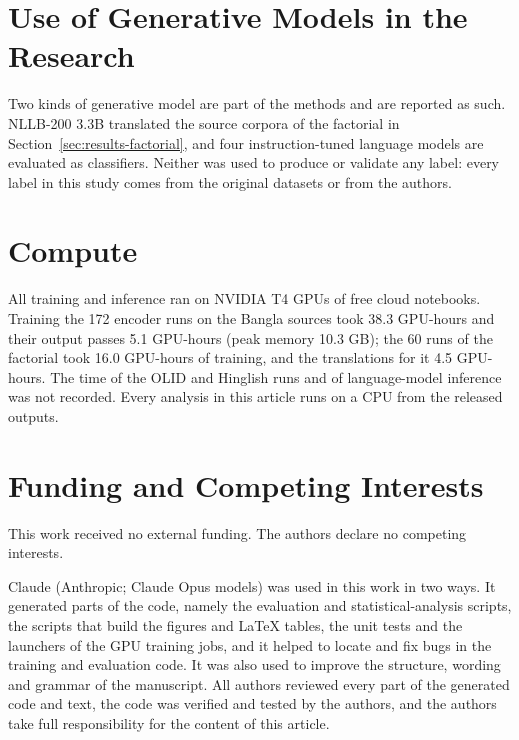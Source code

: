 \section*{Use of Generative Models in the Research}
Two kinds of generative model are part of the methods and are reported as such. NLLB-200 3.3B translated the source
corpora of the factorial in Section~\ref{sec:results-factorial}, and four instruction-tuned language models are
evaluated as classifiers. Neither was used to produce or validate any label: every label in this study comes from the
original datasets or from the authors.

\section*{Compute}
All training and inference ran on NVIDIA T4 GPUs of free cloud notebooks. Training the 172 encoder runs on the
Bangla sources took 38.3 GPU-hours and their output passes 5.1 GPU-hours (peak memory 10.3 GB); the 60 runs of the
factorial took 16.0 GPU-hours of training, and the translations for it 4.5 GPU-hours. The time of the OLID and
Hinglish runs and of language-model inference was not recorded. Every analysis in this article runs on a CPU from the
released outputs.

\section*{Funding and Competing Interests}
This work received no external funding. The authors declare no competing interests.

\begin{acks}
Claude (Anthropic; Claude Opus models) was used in this work in two ways. It generated parts of the code, namely the evaluation and
statistical-analysis scripts, the scripts that build the figures and LaTeX tables, the unit tests and the launchers of
the GPU training jobs, and it helped to locate and fix bugs in the training and evaluation code. It was also used to
improve the structure, wording and grammar of the manuscript. All authors reviewed every part of the generated code
and text, the code was verified and tested by the authors, and the authors take full responsibility for the content
of this article.
\end{acks}
